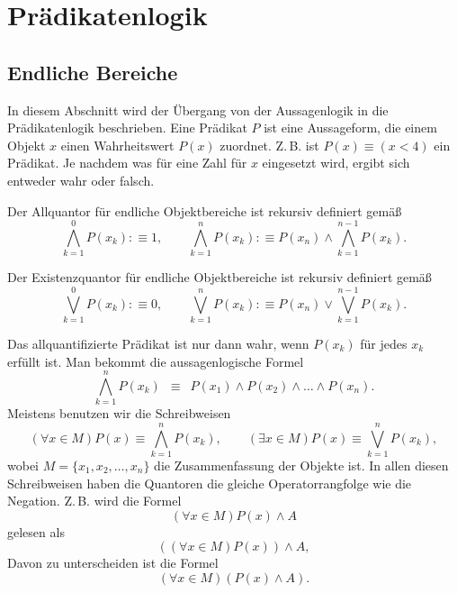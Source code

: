 \newpage
\section{Prädikatenlogik}
\subsection{Endliche Bereiche}
In diesem Abschnitt wird der Übergang von der Aussagenlogik in
die Prädikatenlogik beschrieben. Eine Prädikat $P$ ist eine Aussageform,
die einem Objekt $x$ einen Wahrheitswert $P(x)$ zuordnet. Z.\,B.
ist $P(x)\equiv (x<4)$ ein Prädikat. Je nachdem was für eine Zahl
für $x$ eingesetzt wird, ergibt sich entweder wahr oder falsch.

\begin{Definition}[Allquantor]
Der Allquantor für endliche Objektbereiche
ist rekursiv definiert gemäß%
\[\bigwedge_{k=1}^0 P(x_k) :\equiv 1,\qquad
\bigwedge_{k=1}^n P(x_k) :\equiv P(x_n)\land\bigwedge_{k=1}^{n-1} P(x_k).\]
\end{Definition}

\begin{Definition}[Existenzquantor]
Der Existenzquantor für endliche Objektbereiche
ist rekursiv definiert gemäß%
\[\bigvee_{k=1}^0 P(x_k) :\equiv 0,\qquad
\bigvee_{k=1}^n P(x_k) :\equiv P(x_n)\lor\bigvee_{k=1}^{n-1} P(x_k).\]
\end{Definition}

\noindent
Das allquantifizierte Prädikat ist nur dann wahr, wenn $P(x_k)$ für
jedes $x_k$ erfüllt ist. Man bekommt die aussagenlogische Formel%
\[\bigwedge_{k=1}^n P(x_k)
\enspace\equiv\enspace P(x_1)\land P(x_2)\land\ldots\land P(x_n).\]
Meistens benutzen wir die Schreibweisen
\[(\forall x\in M)P(x) \equiv \bigwedge_{k=1}^n P(x_k),\qquad
(\exists x\in M)P(x) \equiv \bigvee_{k=1}^n P(x_k),\]
wobei $M=\{x_1,x_2,\ldots,x_n\}$ die Zusammenfassung
der Objekte ist. In allen diesen Schreibweisen haben die
Quantoren die gleiche Operatorrangfolge wie die Negation. Z.\,B. wird
die Formel
\[(\forall x\in M)P(x)\land A\]
gelesen als
\[((\forall x\in M)P(x))\land A,\]
Davon zu unterscheiden ist die Formel
\[(\forall x\in M)(P(x)\land A).\]


